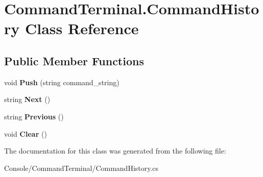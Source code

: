 \hypertarget{class_command_terminal_1_1_command_history}{}\section{Command\+Terminal.\+Command\+History Class Reference}
\label{class_command_terminal_1_1_command_history}
\subsection*{Public Member Functions}
\begin{DoxyCompactItemize}
\item 
\mbox{\label{class_command_terminal_1_1_command_history_a468cb902b41754b3e754e87b64604dd8}} 
void {\bfseries Push} (string command\+\_\+string)
\item 
\mbox{\label{class_command_terminal_1_1_command_history_a327941f014bc3b59b59a0aab9fbd41c8}} 
string {\bfseries Next} ()
\item 
\mbox{\label{class_command_terminal_1_1_command_history_a96c5dbea923ca72fd0e2f400baa681c4}} 
string {\bfseries Previous} ()
\item 
\mbox{\label{class_command_terminal_1_1_command_history_a5882c8ea71e4799986a8aea0cf4fd1e7}} 
void {\bfseries Clear} ()
\end{DoxyCompactItemize}


The documentation for this class was generated from the following file\+:\begin{DoxyCompactItemize}
\item 
Console/\+Command\+Terminal/Command\+History.\+cs\end{DoxyCompactItemize}
